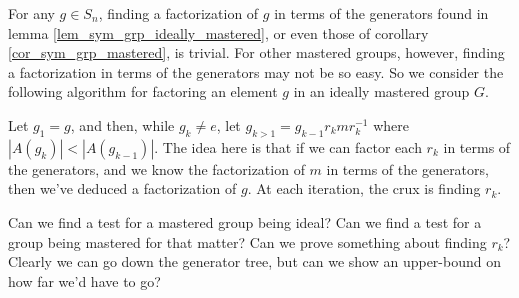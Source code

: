 \documentclass[12pt]{article}
\begin{document}
For any $g\in S_n$, finding a factorization of $g$ in terms of the
generators found in lemma \ref{lem_sym_grp_ideally_mastered}, or even those of corollary \ref{cor_sym_grp_mastered},
is trivial.  For other
mastered groups, however, finding a factorization in terms of the
generators may not be so easy.  So we consider the following algorithm
for factoring an element $g$ in an ideally mastered group $G$.

Let $g_1=g$, and then, while $g_k\neq e$, let $g_{k>1}=g_{k-1}r_kmr_k^{-1}$ where
$|A(g_k)|<|A(g_{k-1})|$.  The idea here is that if we can factor each $r_k$ in terms
of the generators, and we know the factorization of $m$ in terms of the generators,
then we've deduced a factorization of $g$.  At each iteration, the crux is finding $r_k$.

Can we find a test for a mastered group being ideal?  Can we find a test for a group being mastered for
that matter?  Can we prove something about finding $r_k$?  Clearly we can go down the generator
tree, but can we show an upper-bound on how far we'd have to go?
\end{document}
